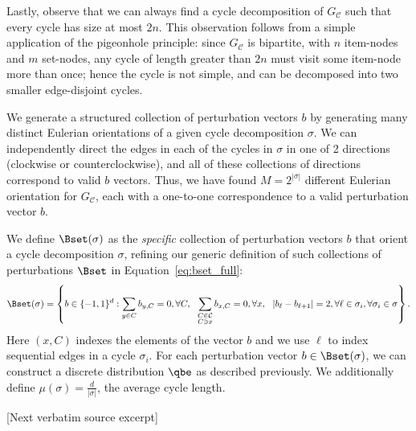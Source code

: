 \documentclass[10pt]{article}
\begin{document}
\begin{ReviewVerbatim}
	Lastly, observe that we can always find a cycle decomposition of $G_\mathcal{C}$ such that every cycle has size at most $2n$. This observation follows from a simple application of the pigeonhole principle: since $G_\mathcal{C}$ is bipartite, with $n$ item-nodes and $m$ set-nodes, any cycle of length greater than $2n$ must visit some item-node more than once; hence the cycle is not simple, and can be decomposed into two smaller edge-disjoint cycles.

	We generate a structured collection of perturbation vectors $b$ by generating many distinct Eulerian orientations of a given cycle decomposition $\sigma$. We can independently direct the edges in each of the	cycles in $\sigma$ in one of 2 directions (clockwise or counterclockwise), and all of these collections of directions correspond to valid $b$ vectors. Thus, we have found $M=2^{|\sigma|}$ different Eulerian orientation for $G_\mathcal{C}$, each with a one-to-one correspondence to a valid perturbation vector $b$.

	We define $\Bset(\sigma)$ as the {\it specific} collection of perturbation vectors $b$ that orient a cycle decomposition $\sigma$, refining our generic definition of such collections of perturbations $\Bset$ in Equation~\eqref{eq:bset_full}:
	\begin{align}
	\label{eq:bset}
	\Bset(\sigma) =
	\left \{
	b \in \lbrace -1, 1 \rbrace^d
	:
	\sum_{y \in C} b_{y,C} = 0, \forall C,
	\ \
	\sum_{\substack{C \in \mathcal{C}\\ C \ni x}} b_{x,C} = 0, \forall x,
	\ \
	|b_\ell - b_{\ell+1} | =2, \forall \ell \in \sigma_i,
	\forall \sigma_i \in \sigma
	\right \}.
	\end{align}
	Here $(x,C)$ indexes the elements of the vector $b$ and we use $\ell$ to index sequential edges in a cycle $\sigma_i$. For each perturbation vector $b \in \Bset(\sigma)$, we can construct a discrete distribution $\qbe$ as described previously. We additionally define $\mu(\sigma) = \frac{d}{|\sigma|}$, the average cycle length.

[Next verbatim source excerpt]


\end{ReviewVerbatim}
\end{document}

